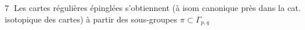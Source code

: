\margin{$\checkmark$}
\textcircled{7} Les cartes régulières  épinglées  s'obtiennent (à isom canonique près dans la cat. isotopique des cartes) à partir des sous-groupes $\pi\subset\Gamma_{p,q}$

